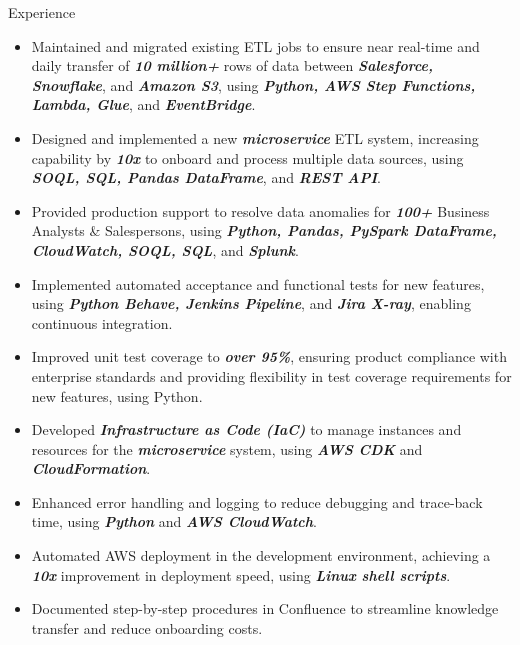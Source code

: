 \documentclass{resume} %
\begin{document}
\begin{workSection}{Experience}
      \experienceItem[
      company=Capital One,
      location=Plano{,} TX,
      position=Senior Software Engineer,
      duration=Feb. 2024 – Present
      ]
      \vspace{-0.65em}
      \begin{itemize}
            \itemsep -6pt {}
            \item Maintained and migrated existing ETL jobs to ensure near real-time and daily transfer of \textit{\textbf{10 million+}} rows of data between \textit{\textbf{Salesforce, Snowflake}}, and \textit{\textbf{Amazon S3}}, using \textit{\textbf{Python, AWS Step Functions, Lambda, Glue}}, and \textit{\textbf{EventBridge}}.
            \item Designed and implemented a new \textit{\textbf{microservice}} ETL system, increasing capability by \textit{\textbf{10x}} to onboard and process multiple data sources, using \textit{\textbf{SOQL, SQL, Pandas DataFrame}}, and \textit{\textbf{REST API}}.
            \item Provided production support to resolve data anomalies for \textit{\textbf{100+}} Business Analysts \& Salespersons, using \textit{\textbf{Python, Pandas, PySpark DataFrame, CloudWatch, SOQL, SQL}}, and \textit{\textbf{Splunk}}.
            \item Implemented automated acceptance and functional tests for new features, using \textit{\textbf{Python Behave, Jenkins Pipeline}}, and \textit{\textbf{Jira X-ray}}, enabling continuous integration.
            \item Improved unit test coverage to \textit{\textbf{over 95\%}}, ensuring product compliance with enterprise standards and providing flexibility in test coverage requirements for new features, using Python.
            \item Developed \textit{\textbf{Infrastructure as Code (IaC)}} to manage instances and resources for the \textit{\textbf{microservice}} system, using \textit{\textbf{AWS CDK}} and \textit{\textbf{CloudFormation}}.
            \item Enhanced error handling and logging to reduce debugging and trace-back time, using \textit{\textbf{Python}} and \textit{\textbf{AWS CloudWatch}}.
            \item Automated AWS deployment in the development environment, achieving a \textit{\textbf{10x}} improvement in deployment speed, using \textit{\textbf{Linux shell scripts}}.
            \item Documented step-by-step procedures in Confluence to streamline knowledge transfer and reduce onboarding costs.
      \end{itemize}


\end{workSection}
\end{document}
